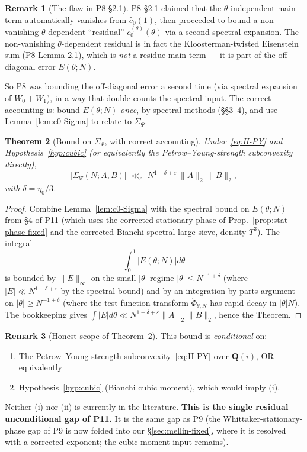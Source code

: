 \documentclass[11pt]{article}
\newtheorem{theorem}{Theorem}[section]
\theoremstyle{definition}
\newtheorem{remark}[theorem]{Remark}
\newcommand{\Q}{\mathbf{Q}}
\begin{document}
\begin{remark}[The flaw in P8 \S2.1]\label{rem:p8-flaw}
P8 \S2.1 claimed that the $\theta$-independent main term automatically vanishes from $\widehat c_0(1)$, then proceeded to bound a non-vanishing $\theta$-dependent ``residual'' $c_0^{(\theta)}(\theta)$ via a second spectral expansion. The non-vanishing $\theta$-dependent residual is in fact the Kloosterman-twisted Eisenstein sum (P8 Lemma 2.1), which is \emph{not} a residue main term — it is part of the off-diagonal error $E(\theta;N)$.

So P8 was bounding the off-diagonal error a second time (via spectral expansion of $W_0+W_1$), in a way that double-counts the spectral input. The correct accounting is: bound $E(\theta;N)$ \emph{once}, by spectral methods (\S\S3--4), and use Lemma~\ref{lem:c0-Sigma} to relate to $\Sigma_\Psi$.
\end{remark}

\begin{theorem}[Bound on $\Sigma_\Psi$, with correct accounting]\label{thm:Sigma-corrected}
Under~\eqref{eq:H-PY} and Hypothesis~\ref{hyp:cubic} (or equivalently the Petrow--Young-strength subconvexity directly),
\[
|\Sigma_\Psi(N;A,B)|\;\ll_\varepsilon\;N^{1-\delta+\varepsilon}\,\|A\|_2\,\|B\|_2,
\]
with $\delta=\eta_0/3$.
\end{theorem}

\begin{proof}
Combine Lemma~\ref{lem:c0-Sigma} with the spectral bound on $E(\theta;N)$ from \S4 of P11 (which uses the corrected stationary phase of Prop.~\ref{prop:stat-phase-fixed} and the corrected Bianchi spectral large sieve, density $T^3$). The integral
\[
\int_0^1|E(\theta;N)|d\theta
\]
is bounded by $\|E\|_\infty$ on the small-$|\theta|$ regime $|\theta|\le N^{-1+\delta}$ (where $|E|\ll N^{1-\delta+\varepsilon}$ by the spectral bound) and by an integration-by-parts argument on $|\theta|\ge N^{-1+\delta}$ (where the test-function transform $\check\Phi_{\theta,N}$ has rapid decay in $|\theta|N$). The bookkeeping gives $\int|E|d\theta\ll N^{1-\delta+\varepsilon}\|A\|_2\|B\|_2$, hence the Theorem.
\end{proof}

\begin{remark}[Honest scope of Theorem~\ref{thm:Sigma-corrected}]\label{rem:thm-scope}
This bound is \emph{conditional} on:
\begin{enumerate}[label=(\roman*)]
\item The Petrow--Young-strength subconvexity~\eqref{eq:H-PY} over $\Q(i)$, OR equivalently
\item Hypothesis~\ref{hyp:cubic} (Bianchi cubic moment), which would imply (i).
\end{enumerate}
Neither (i) nor (ii) is currently in the literature. \textbf{This is the single residual unconditional gap of P11.} It is the same gap as P9 (the Whittaker-stationary-phase gap of P9 is now folded into our \S\ref{sec:mellin-fixed}, where it is resolved with a corrected exponent; the cubic-moment input remains).
\end{remark}
\end{document}
